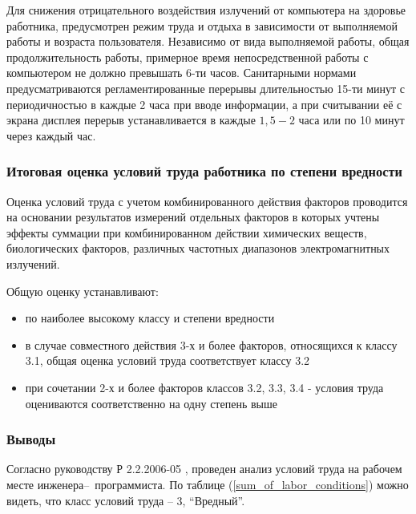 Для снижения отрицательного воздействия излучений от компьютера
на здоровье работника, предусмотрен режим труда и отдыха в зависимости от выполняемой
работы и возраста пользователя. Независимо от вида выполняемой работы, общая
продолжительность работы, примерное время непосредственной работы с компьютером
не должно превышать 6-ти часов. Санитарными нормами предусматриваются регламентированные
перерывы длительностью 15-ти минут с периодичностью в каждые 2 часа при вводе
информации, а при считывании её с экрана дисплея перерыв устанавливается в
каждые $1,5 - 2$ часа или по 10 минут через каждый час.




\subsubsection{Итоговая оценка условий труда работника по степени вредности}

Оценка условий труда с учетом комбинированного действия факторов проводится на
основании результатов измерений отдельных факторов в которых учтены эффекты
суммации при комбинированном действии химических веществ, биологических факторов,
различных частотных диапазонов электромагнитных излучений.

Общую оценку устанавливают:

\begin{itemize}
    \item   по наиболее высокому классу и степени вредности
    \item   в случае совместного действия 3-х и более факторов, относящихся к классу
            3.1, общая оценка условий труда соответствует классу 3.2
    \item   при сочетании 2-х и более факторов классов 3.2, 3.3, 3.4 - условия
            труда оцениваются соответственно на одну степень выше
\end{itemize}



\subsubsection{Выводы}

Согласно руководству Р 2.2.2006-05 \cite{ecology_man_2_2_2006_05}, проведен анализ
условий труда на рабочем месте инженера--~программиста. По таблице
(\ref{sum_of_labor_conditions}) можно видеть, что класс условий труда – 3, ``Вредный''.
